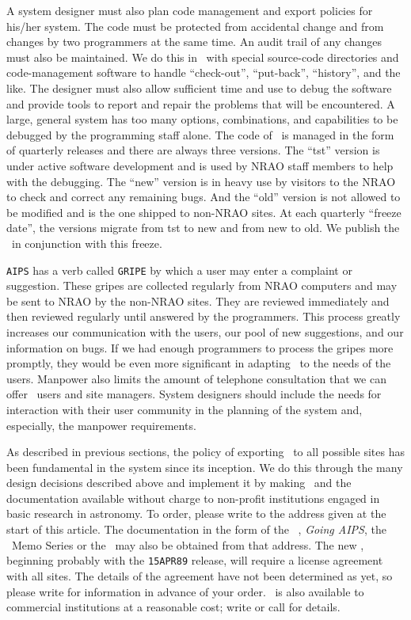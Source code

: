 
     A system designer must also plan code management and export policies
for his/her system.  The code must be protected from accidental change
and from changes by two programmers at the same time.  An audit trail
of any changes must also be maintained.  We do this in \AIPS\ with
special source-code directories and code-management software to handle
``check-out'', ``put-back'', ``history'', and the like.  The designer
must also allow sufficient time and use to debug the software and provide
tools to report and repair the problems that will be encountered.  A large,
general system has too many options, combinations, and capabilities to
be debugged by the programming staff alone.  The code of \AIPS\ is
managed in the form of quarterly releases and there are always three
versions.  The ``tst'' version is under active software development and
is used by NRAO staff members to help with the debugging.  The ``new''
version is in heavy use by visitors to the NRAO to check and correct
any remaining bugs.  And the ``old'' version is not allowed to be modified
and is the one shipped to non-NRAO sites.  At each quarterly ``freeze
date'', the versions migrate from tst to new and from new to old.  We
publish the \Aipsletter\ in conjunction with this freeze.

     {\tt AIPS}
has a verb called {\tt GRIPE} by which a user may enter a complaint or
suggestion.  These gripes are collected regularly from NRAO computers
and may be sent to NRAO by the non-NRAO sites.  They are reviewed
immediately and then reviewed regularly until answered by the programmers.
This process greatly increases our communication with the users, our
pool of new suggestions, and our information on bugs.  If we had enough
programmers to process the gripes more promptly, they would be even more
significant in adapting \AIPS\ to the needs of the users.  Manpower also
limits the amount of telephone consultation that we can offer \AIPS\
users and site managers.  System designers should include the needs for
interaction with their user community in the planning of the system
and, especially, the manpower requirements.

     As described in previous sections, the policy of exporting \AIPS\
to all possible sites has been fundamental in the system since its inception.
We do this through the many design decisions described above and implement it
by making \Aips\ and the documentation available without charge to
non-profit institutions engaged in basic research in astronomy.
To order, please write to the address given at the start of this article.
The documentation in the form of the {\AIPS\ \Cookbook}, {\it Going AIPS},
the \AIPS\ Memo Series or the \Aipsletter\ may also be obtained from
that address.  The new \AIPS, beginning probably with the
{\tt 15APR89} release, will require a license agreement with all sites.
The details of the agreement have not been determined as yet, so
please write for information in advance of your order.  \AIPS\ is also
available to commercial institutions at a reasonable cost; write or
call for details.

